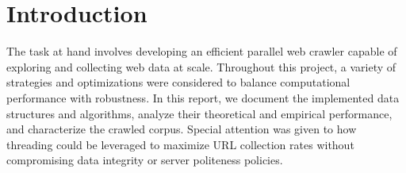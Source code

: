 \section{Introduction}



The task at hand involves developing an efficient parallel web crawler capable of exploring and collecting web data at scale. Throughout this project, a variety of strategies and optimizations were considered to balance computational performance with robustness. In this report, we document the implemented data structures and algorithms, analyze their theoretical and empirical performance, and characterize the crawled corpus. Special attention was given to how threading could be leveraged to maximize URL collection rates without compromising data integrity or server politeness policies.





